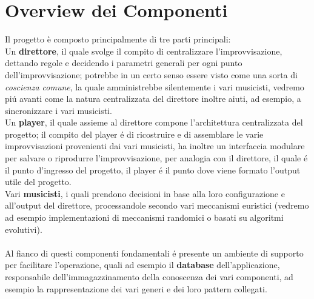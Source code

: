 \section{Overview dei Componenti}
Il progetto \`e composto principalmente di tre parti principali:\\
Un \textbf{direttore}, il quale svolge il compito di centralizzare l'improvvisazione,
dettando regole e decidendo i parametri generali per ogni punto dell'improvvisazione;
potrebbe in un certo senso essere visto come una sorta di \emph{coscienza comune},
la quale amministrebbe silentemente i vari musicisti, vedremo pi\'u avanti come
la natura centralizzata del direttore inoltre aiuti, ad esempio, a sincronizzare
i vari musicisti.\\
Un \textbf{player}, il quale assieme al direttore compone l'architettura centralizzata
del progetto; il compito del player \'e di ricostruire e di assemblare le varie
improvvisazioni provenienti dai vari musicisti, ha inoltre un interfaccia
modulare per salvare o riprodurre l'improvvisazione, per analogia con il direttore,
il quale \'e il punto d'ingresso del progetto, il player \'e il punto dove viene
formato l'output utile del progetto.\\
Vari \textbf{musicisti}, i quali prendono decisioni in base alla loro configurazione
e all'output del direttore, processandole secondo vari meccanismi euristici
(vedremo ad esempio implementazioni di meccanismi randomici o basati su algoritmi evolutivi).\\
\\
Al fianco di questi componenti fondamentali \'e presente un ambiente di supporto
per facilitare l'operazione, quali ad esempio il \textbf{database} dell'applicazione,
responsabile dell'immagazzinamento della conoscenza dei vari componenti, ad
esempio la rappresentazione dei vari generi e dei loro pattern collegati.

